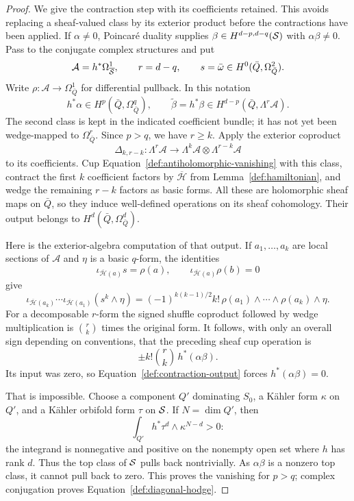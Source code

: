 \begin{proof}
We give the contraction step with its coefficients retained.
This avoids replacing a sheaf-valued class by its exterior product
before the contractions have been applied.  If $\alpha\ne0$,
Poincar\'e duality supplies
$\beta\in H^{d-p,d-q}(\mathcal S)$ with $\alpha\beta\ne0$.
Pass to the conjugate complex structures and put
\[
 \mathcal A=h^*\Omega^1_{\overline{\mathcal S}},
 \qquad r=d-q,
 \qquad s=\bar\omega\in H^0(\bar Q,\Omega^2_{\bar Q}).
\]
Write $\rho:\mathcal A\to\Omega^1_{\bar Q}$ for differential
pullback.
In this notation
\[
 h^*\alpha\in H^p(\bar Q,\Omega^q_{\bar Q}),
 \qquad
 \widetilde\beta=h^*\beta
       \in H^{d-p}(\bar Q,\Lambda^r\mathcal A).
\]
The second class is kept in the indicated coefficient bundle;
it has not yet been wedge-mapped to $\Omega^r_{\bar Q}$.
Since $p>q$, we have $r\geq k$.
Apply the exterior coproduct
\[
 \Delta_{k,r-k}:\Lambda^r\mathcal A
       \longrightarrow\Lambda^k\mathcal A
                         \otimes\Lambda^{r-k}\mathcal A
\]
to its coefficients.  Cup Equation~\eqref{def:antiholomorphic-vanishing}
with this class, contract the first $k$ coefficient factors by
$\overline{\mathcal H}$ from
Lemma~\ref{def:hamiltonian}, and wedge the remaining $r-k$
factors as basic forms.  All these are holomorphic sheaf maps on
$\bar Q$, so they induce well-defined operations on its sheaf
cohomology.  Their output belongs to
$H^d(\bar Q,\Omega^d_{\bar Q})$.

Here is the exterior-algebra computation of that output.  If
$a_1,\ldots,a_k$ are local sections of $\mathcal A$ and $\eta$
is a basic $q$-form, the identities
\[
 \iota_{\overline{\mathcal H}(a)}s=\rho(a),
 \qquad
 \iota_{\overline{\mathcal H}(a)}\rho(b)=0
\]
give
\[
 \iota_{\overline{\mathcal H}(a_k)}\cdots
 \iota_{\overline{\mathcal H}(a_1)}(s^k\wedge\eta)
 =(-1)^{k(k-1)/2}k!\,
       \rho(a_1)\wedge\cdots\wedge\rho(a_k)\wedge\eta.
\]
For a decomposable $r$-form the signed shuffle coproduct followed
by wedge multiplication is $\binom rk$ times the original form.
It follows, with only an overall sign depending on conventions,
that the preceding sheaf cup operation is
\begin{equation}\label{def:contraction-output}
                      \pm k!\binom rk\,h^*(\alpha\beta).
\end{equation}
Its input was zero, so Equation~\eqref{def:contraction-output}
forces $h^*(\alpha\beta)=0$.

That is impossible.  Choose a component $Q'$ dominating $S_0$,
a K\"ahler form $\kappa$ on $Q'$, and a K\"ahler orbifold form
$\tau$ on $\mathcal S$.  If $N=\dim Q'$, then
\[
                 \int_{Q'}h^*\tau^d\wedge\kappa^{N-d}>0:
\]
the integrand is nonnegative and positive on the nonempty open
set where $h$ has rank $d$.  Thus the top class of $\mathcal S$ pulls
back nontrivially.  As $\alpha\beta$ is a nonzero top class, it
cannot pull back to zero.  This proves the vanishing for $p>q$;
complex conjugation proves Equation~\eqref{def:diagonal-hodge}.


\end{proof}
